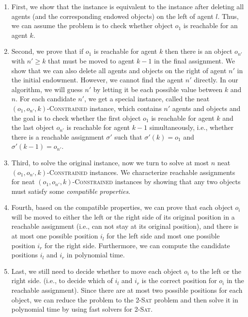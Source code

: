 \begin{enumerate}
    \item First, we show that the instance is equivalent to the instance after deleting all agents (and the corresponding endowed objects) on the left of agent $l$. Thus, we can assume the problem is to check whether object $o_1$ is reachable for an agent $k$.
    \item Second, we prove that if $o_1$ is reachable for agent $k$ then there is an object $o_{n'}$ with $n'\geq k$ that must be moved to agent $k-1$ in the final assignment. We show that we can also delete all agents and objects on the right of agent $n'$ in the initial endowment. However, we cannot find the agent $n'$ directly. In our algorithm, we will guess $n'$ by letting it be each possible value between $k$ and $n$. For each candidate $n'$, we get a special instance, called
        the neat $(o_1,o_{n'},k)$-\textsc{Constrained} instance, which contains $n'$ agents and objects and the goal is to check whether the first object $o_1$ is reachable for agent $k$ and the last object $o_{n'}$ is reachable for agent $k-1$ simultaneously, i.e., whether there is a reachable assignment $\sigma'$ such that $\sigma'(k)=o_1$ and $\sigma'(k-1)=o_{n'}$.
    \item Third, to solve the original instance, now we turn to solve at most $n$ neat $(o_1,o_{n'},k)$-\textsc{Constrained} instances.
    We characterize reachable assignments for neat $(o_1,o_{n'},k)$-\textsc{Constrained} instances by showing that any two objects must satisfy some \emph{compatible properties}.
\item Fourth, based on the compatible properties, we can prove that each object $o_i$ will be moved to either the left or the right side of its original position in a reachable assignment (i.e., can not stay at its original position), and there is at most one possible position $i_l$ for the left side and most one possible position $i_r$ for the right side. Furthermore, we can compute the candidate positions $i_l$ and $i_r$ in polynomial time.
 \item Last, we still need to decide whether to move each object $o_i$ to the left or the right side.
 (i.e., to decide which of $i_l$ and $i_r$ is the correct position for $o_i$ in the reachable assignment). Since there are at most two possible positions for each object, we can reduce the problem to the \textsc{2-Sat} problem and then solve it in polynomial time by using fast solvers for \textsc{2-Sat}.
\end{enumerate}



